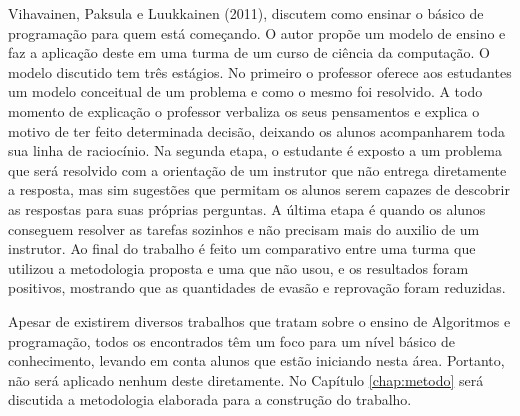 \nocite{Vihavainen:2011:EAM:1953163.1953196}
Vihavainen, Paksula e Luukkainen (2011), discutem como ensinar o básico de programação para quem está começando. O autor propõe um modelo de ensino e faz a aplicação deste em uma turma de um curso de ciência da computação. O modelo discutido tem três estágios. No primeiro o professor oferece aos estudantes um modelo conceitual de um problema e como o mesmo foi resolvido. A todo momento de explicação o professor verbaliza os seus pensamentos e explica o motivo de ter feito determinada decisão, deixando os alunos acompanharem toda sua linha de raciocínio. Na segunda etapa, o estudante é exposto a um problema que será resolvido com a orientação de um instrutor que não entrega diretamente a resposta, mas sim sugestões que permitam os alunos serem capazes de descobrir as respostas para suas próprias perguntas. A última etapa é quando os alunos conseguem resolver as tarefas sozinhos e não precisam mais do auxilio de um instrutor. Ao final do trabalho é feito um comparativo entre uma turma que utilizou a metodologia proposta e uma que não usou, e os resultados foram positivos, mostrando que as quantidades de evasão e reprovação foram reduzidas.

Apesar de existirem diversos trabalhos que tratam sobre o ensino de Algoritmos e programação, todos os encontrados têm um foco para um nível básico de conhecimento, levando em conta alunos que estão iniciando nesta área. Portanto, não será aplicado nenhum deste diretamente. No Capítulo \ref{chap:metodo} será discutida a metodologia elaborada para a construção do trabalho.




